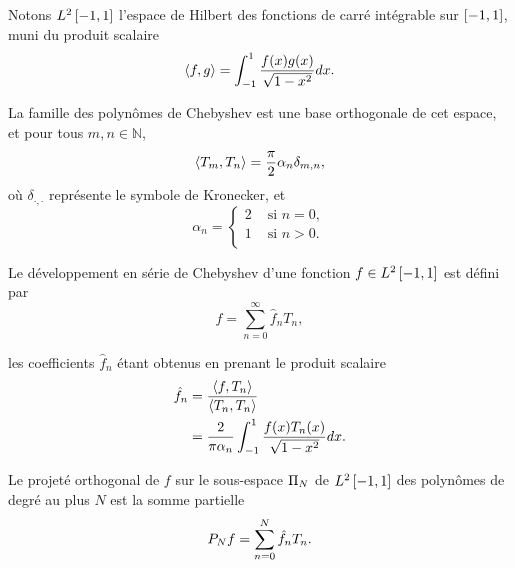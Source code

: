 Notons $L^2\left[ -1, 1 \right]$ l'espace de Hilbert des fonctions de carré intégrable sur $\left[ -1, 1 \right]$, muni du produit scalaire
\begin{equation}
	\scalprod{f}{g} =
	\int_{-1}^{1} \frac{f(x) g(x)}{\sqrt{1 - x^2}} dx.
	\label{eq:chebyshev_scalar_product}
\end{equation}

La famille des polynômes de Chebyshev est une base orthogonale de cet espace, et pour tous $m,n \in \mathbb{N}$,
\begin{equation}
	\scalprod{T_m}{T_n} =
	\frac{\pi}{2} \alpha_n \delta_{m,n},
	\label{eq:chebyshev_orthogonality}
\end{equation}
où $\delta_{\cdot,\cdot}$ représente le symbole de Kronecker, et
\begin{equation}
	\alpha_n = 
	\begin{cases}
	 2 & \text{\ si\ } n = 0,   \\ 
	 1 & \text{\ si\ } n > 0.\\ 
	\end{cases}
\end{equation}

Le développement en série de Chebyshev d'une fonction $f \in L^2\left[ -1, 1 \right]$ est défini par
\begin{equation}
	f = \sum_{n=0}^{\infty} \hat{f}_n T_n,
	\label{eq:chebyshev_series}
\end{equation}

les coefficients $\hat{f}_n$ étant obtenus en prenant le produit scalaire
\begin{align}
	\hat{f}_n 
	&= \frac{\scalprod{f}{T_n}}{\scalprod{T_n}{T_n}} \nonumber \\
	&= \frac{2}{\pi \alpha_n} \int_{-1}^{1} \frac{f(x) T_n(x)}{\sqrt{1 - x^2}} dx.
	\label{eq:chebyshev_series_coeffs}
\end{align}

Le projeté orthogonal de $f$ sur le sous-espace $\Pi_{N}$ de $L^2\left[ -1, 1 \right]$ des polynômes de degré au plus $N$ est la somme partielle%
\begin{equation}
	\truncseries{f}{N} = \sum_{n=0}^{N} \hat{f}_n T_n.
	\label{chebyshev_truncated_series}
\end{equation}


